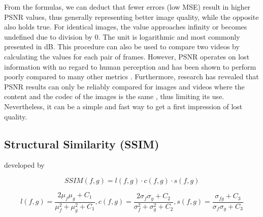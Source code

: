 From the formulas, we can deduct that fewer errors (low MSE) result in higher PSNR values, thus generally representing better image quality, while the opposite also holds true. For identical images, the value approaches infinity or becomes undefined due to division by 0. The unit is logarithmic and most commonly presented in dB. This procedure can also be used to compare two videos by calculating the values for each pair of frames. However, PSNR operates on lost information with no regard to human perception and has been shown to perform poorly compared to many other metrics \cite{HuGh08} \cite{HuGh12}. Furthermore, research has revealed that PSNR results can only be reliably compared for images and videos where the content and the codec of the images is the same \cite{HuGh08}, thus limiting its use. Nevertheless, it can be a simple and fast way to get a first impression of lost quality.



\subsection{Structural Similarity (SSIM)}
developed by \cite{WBSS04}

\begin{equation}
SSIM(f,g) = l(f,g) \cdot c(f,g) \cdot s(f,g)
\label{equation:quality_of_experience:SSIM_1}
\end{equation}

\begin{equation}
l(f,g) = \dfrac{2\mu_{f}\mu_{g}+C_{1}}{\mu_{f}^{2} + \mu_{g}^{2}+C_{1}}, 
c(f,g) = \dfrac{2\sigma_{f}\sigma_{g}+C_{2}}{\sigma_{f}^{2} + \sigma_{g}^{2}+C_{2}}, 
s(f,g) = \dfrac{\sigma_{fg}+C_{3}}{\sigma_{f}\sigma_{g}+C_{3}}
\label{equation:quality_of_experience:SSIM_2}
\end{equation}

